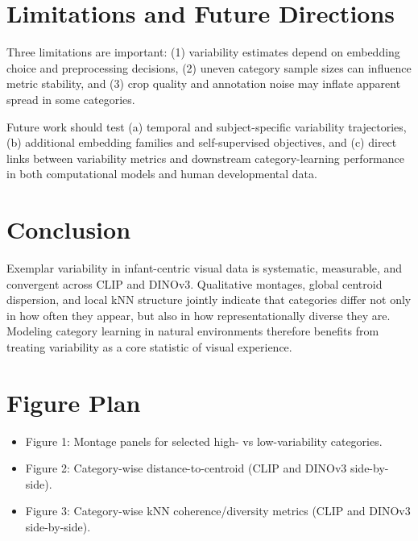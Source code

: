 \documentclass[11pt]{article}
\begin{document}
\section*{Limitations and Future Directions}
Three limitations are important: (1) variability estimates depend on embedding choice and preprocessing decisions, (2) uneven category sample sizes can influence metric stability, and (3) crop quality and annotation noise may inflate apparent spread in some categories.

Future work should test (a) temporal and subject-specific variability trajectories, (b) additional embedding families and self-supervised objectives, and (c) direct links between variability metrics and downstream category-learning performance in both computational models and human developmental data.

\section*{Conclusion}
Exemplar variability in infant-centric visual data is systematic, measurable, and convergent across CLIP and DINOv3. Qualitative montages, global centroid dispersion, and local kNN structure jointly indicate that categories differ not only in how often they appear, but also in how representationally diverse they are. Modeling category learning in natural environments therefore benefits from treating variability as a core statistic of visual experience.

\section*{Figure Plan}
\begin{itemize}
  \item Figure 1: Montage panels for selected high- vs low-variability categories.
  \item Figure 2: Category-wise distance-to-centroid (CLIP and DINOv3 side-by-side).
  \item Figure 3: Category-wise kNN coherence/diversity metrics (CLIP and DINOv3 side-by-side).
\end{itemize}
\end{document}
